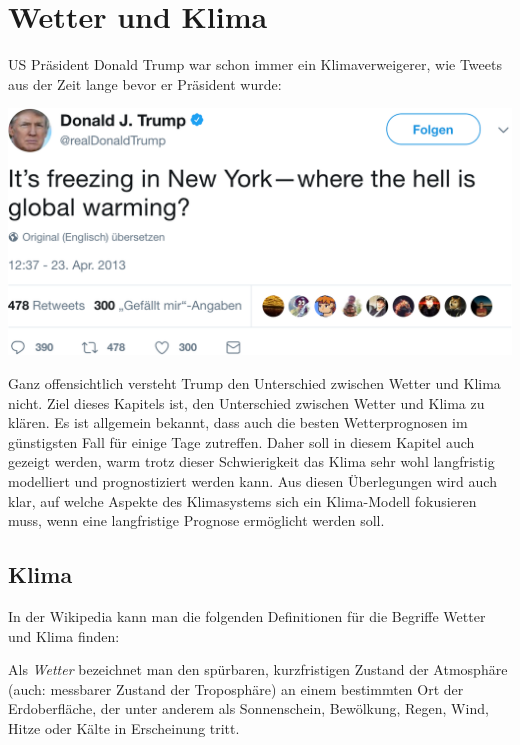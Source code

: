 %
%
%
%
\chapter{Wetter und Klima}
US Präsident Donald Trump war schon immer ein Klimaverweigerer, wie Tweets
aus der Zeit lange bevor er Präsident wurde:
\begin{center}
\includegraphics[width=\hsize]{chapters/1/trump.png}
\end{center}
Ganz offensichtlich versteht Trump den Unterschied zwischen Wetter und
Klima nicht.
Ziel dieses Kapitels ist, den Unterschied zwischen Wetter und Klima
zu klären.
Es ist allgemein bekannt, dass auch die besten Wetterprognosen im
günstigsten Fall für einige Tage zutreffen.
Daher soll in diesem Kapitel auch gezeigt werden, warm trotz dieser
Schwierigkeit das Klima sehr wohl langfristig modelliert und prognostiziert
werden kann.
Aus diesen Überlegungen wird auch klar, auf welche Aspekte des Klimasystems
sich ein Klima-Modell fokusieren muss, wenn eine langfristige Prognose
ermöglicht werden soll.

\section{Klima}
In der Wikipedia kann man die folgenden Definitionen für die Begriffe Wetter
und Klima finden:

\begin{definition}
Als {\em Wetter} bezeichnet man den
spürbaren, kurzfristigen Zustand der Atmosphäre (auch: messbarer
Zustand der Troposphäre) an einem bestimmten Ort der Erdoberfläche,
der unter anderem als Sonnenschein, Bewölkung, Regen, Wind, Hitze
oder Kälte in Erscheinung tritt.
\cite{skript:wetter}
\end{definition}

